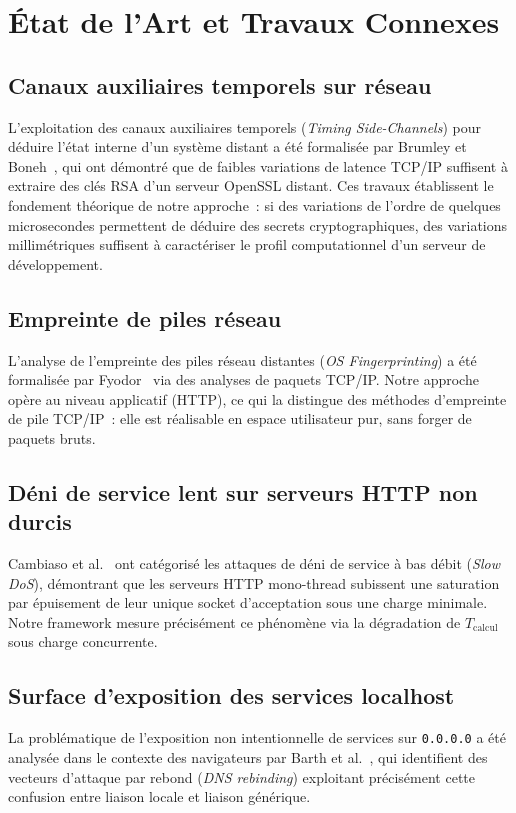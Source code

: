 \documentclass[10pt,conference,compsoc]{IEEEtran}
\begin{document}
\section{État de l'Art et Travaux Connexes}
\label{sec:etat_art}

\subsection{Canaux auxiliaires temporels sur réseau}
L'exploitation des canaux auxiliaires temporels (\textit{Timing
Side-Channels}) pour déduire l'état interne d'un système distant a été
formalisée par Brumley et Boneh~\cite{brumley2003remote}, qui ont
démontré que de faibles variations de latence TCP/IP suffisent à extraire
des clés RSA d'un serveur OpenSSL distant. Ces travaux établissent le
fondement théorique de notre approche~: si des variations de l'ordre de
quelques microsecondes permettent de déduire des secrets cryptographiques,
des variations millimétriques suffisent à caractériser le profil
computationnel d'un serveur de développement.

\subsection{Empreinte de piles réseau}
L'analyse de l'empreinte des piles réseau distantes (\textit{OS
Fingerprinting}) a été formalisée par Fyodor~\cite{fyodor1998} via des
analyses de paquets TCP/IP. Notre approche opère au niveau applicatif
(HTTP), ce qui la distingue des méthodes d'empreinte de pile TCP/IP~:
elle est réalisable en espace utilisateur pur, sans forger de paquets
bruts.

\subsection{Déni de service lent sur serveurs HTTP non durcis}
Cambiaso et al.~\cite{cambiaso2013slow} ont catégorisé les attaques de
déni de service à bas débit (\textit{Slow DoS}), démontrant que les
serveurs HTTP mono-thread subissent une saturation par épuisement de
leur unique socket d'acceptation sous une charge minimale. Notre
framework mesure précisément ce phénomène via la dégradation de
$T_{\mathrm{calcul}}$ sous charge concurrente.

\subsection{Surface d'exposition des services localhost}
La problématique de l'exposition non intentionnelle de services sur
\texttt{0.0.0.0} a été analysée dans le contexte des navigateurs par
Barth et al.~\cite{barth2008robust}, qui identifient des vecteurs
d'attaque par rebond (\textit{DNS rebinding}) exploitant précisément
cette confusion entre liaison locale et liaison générique.
\end{document}
